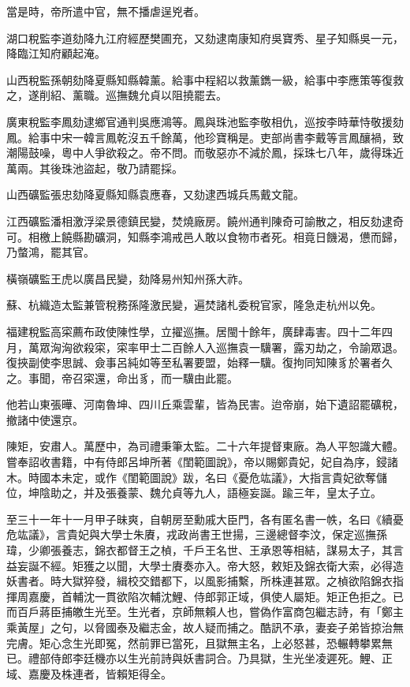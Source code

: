 \begin{pinyinscope}
當是時，帝所遣中官，無不播虐逞兇者。

湖口稅監李道劾降九江府經歷樊圃充，又劾逮南康知府吳寶秀、星子知縣吳一元，降臨江知府顧起淹。

山西稅監孫朝劾降夏縣知縣韓薰。給事中程紹以救薰鐫一級，給事中李應策等復救之，遂削紹、薰職。巡撫魏允貞以阻撓罷去。

廣東稅監李鳳劾逮鄉官通判吳應鴻等。鳳與珠池監李敬相仇，巡按李時華恃敬援劾鳳。給事中宋一韓言鳳乾沒五千餘萬，他珍寶稱是。吏部尚書李戴等言鳳釀禍，致潮陽鼓噪，粵中人爭欲殺之。帝不問。而敬惡亦不減於鳳，採珠七八年，歲得珠近萬兩。其後珠池盜起，敬乃請罷採。

山西礦監張忠劾降夏縣知縣袁應春，又劾逮西城兵馬戴文龍。

江西礦監潘相激浮梁景德鎮民變，焚燒廠房。饒州通判陳奇可諭散之，相反劾逮奇可。相檄上饒縣勘礦洞，知縣李鴻戒邑人敢以食物市者死。相竟日饑渴，憊而歸，乃螫鴻，罷其官。

橫嶺礦監王虎以廣昌民變，劾降易州知州孫大祚。

蘇、杭織造太監兼管稅務孫隆激民變，遍焚諸札委稅官家，隆急走杭州以免。

福建稅監高寀薦布政使陳性學，立擢巡撫。居閩十餘年，廣肆毒害。四十二年四月，萬眾洶洶欲殺寀，寀率甲士二百餘人入巡撫袁一驥署，露刃劫之，令諭眾退。復挾副使李思誠、僉事呂純如等至私署要盟，始釋一驥。復拘同知陳豸於署者久之。事聞，帝召寀還，命出豸，而一驥由此罷。

他若山東張曄、河南魯坤、四川丘乘雲輩，皆為民害。迨帝崩，始下遺詔罷礦稅，撤諸中使還京。

陳矩，安肅人。萬歷中，為司禮秉筆太監。二十六年提督東廠。為人平恕識大體。嘗奉詔收書籍，中有侍郎呂坤所著《閨範圖說》，帝以賜鄭貴妃，妃自為序，鋟諸木。時國本未定，或作《閨範圖說》跋，名曰《憂危竑議》，大指言貴妃欲奪儲位，坤陰助之，并及張養蒙、魏允貞等九人，語極妄誕。踰三年，皇太子立。

至三十一年十一月甲子昧爽，自朝房至勳戚大臣門，各有匿名書一帙，名曰《續憂危竑議》，言貴妃與大學士朱賡，戎政尚書王世揚，三邊總督李汶，保定巡撫孫瑋，少卿張養志，錦衣都督王之楨，千戶王名世、王承恩等相結，謀易太子，其言益妄誕不經。矩獲之以聞，大學士賡奏亦入。帝大怒，敕矩及錦衣衛大索，必得造妖書者。時大獄猝發，緝校交錯都下，以風影捕繫，所株連甚眾。之楨欲陷錦衣指揮周嘉慶，首輔沈一貫欲陷次輔沈鯉、侍郎郭正域，俱使人屬矩。矩正色拒之。已而百戶蔣臣捕皦生光至。生光者，京師無賴人也，嘗偽作富商包繼志詩，有「鄭主乘黃屋」之句，以脅國泰及繼志金，故人疑而捕之。酷訊不承，妻妾子弟皆掠治無完膚。矩心念生光即冤，然前罪已當死，且獄無主名，上必怒甚，恐輾轉攀累無已。禮部侍郎李廷機亦以生光前詩與妖書詞合。乃具獄，生光坐凌遲死。鯉、正域、嘉慶及株連者，皆賴矩得全。


\end{pinyinscope}
